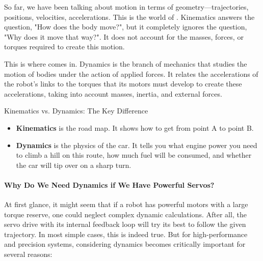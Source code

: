 So far, we have been talking about motion in terms of geometry—trajectories, positions, velocities, accelerations. This is the world of . Kinematics answers the question, "How does the body move?", but it completely ignores the question, "Why does it move that way?". It does not account for the masses, forces, or torques required to create this motion.

This is where  comes in. Dynamics is the branch of mechanics that studies the motion of bodies under the action of applied forces. It relates the accelerations of the robot's links to the torques that its motors must develop to create these accelerations, taking into account masses, inertia, and external forces.

\begin{tipbox}{Kinematics vs. Dynamics: The Key Difference}
\begin{itemize}
    \item \textbf{Kinematics} is the road map. It shows how to get from point A to point B.
    \item \textbf{Dynamics} is the physics of the car. It tells you what engine power you need to climb a hill on this route, how much fuel will be consumed, and whether the car will tip over on a sharp turn.
\end{itemize}
\end{tipbox}

\paragraph{Why Do We Need Dynamics if We Have Powerful Servos?}
At first glance, it might seem that if a robot has powerful motors with a large torque reserve, one could neglect complex dynamic calculations. After all, the servo drive with its internal feedback loop will try its best to follow the given trajectory. In most simple cases, this is indeed true. But for high-performance and precision systems, considering dynamics becomes critically important for several reasons:


